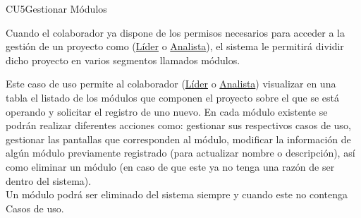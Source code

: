 	\begin{UseCase}{CU5}{Gestionar Módulos}{
	
	Cuando el colaborador ya dispone de los permisos necesarios para acceder a la gestión de un proyecto como (\hyperlink{jefe}{Líder} o \hyperlink{analista}{Analista}), el sistema le permitirá dividir dicho proyecto en varios segmentos llamados módulos. 
	
	Este caso de uso permite al colaborador (\hyperlink{jefe}{Líder} o \hyperlink{analista}{Analista}) visualizar en una tabla el listado de los módulos que componen el proyecto sobre el que se está operando y solicitar el registro de uno nuevo. En cada módulo existente se podrán realizar diferentes acciones como: gestionar sus respectivos casos de uso, gestionar las pantallas que corresponden al módulo, modificar la información de algún módulo previamente registrado (para actualizar nombre o descripción), así como eliminar un módulo (en caso de que este ya no tenga una razón de ser dentro del sistema).\\
	
	Un módulo podrá ser eliminado del sistema siempre y cuando este no contenga Casos de uso.
	
	}
\end{UseCase}
